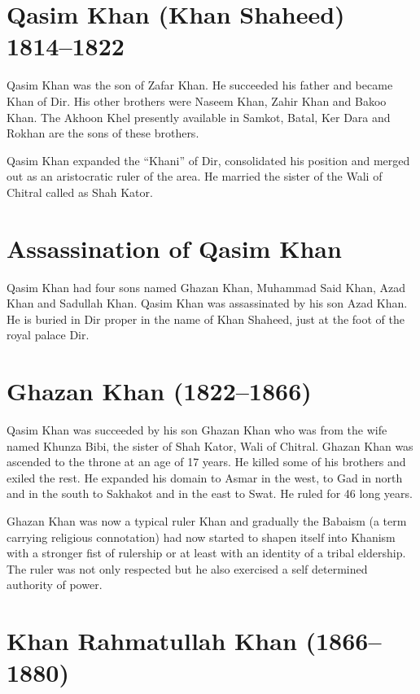 \documentclass[twoside,openright]{book}
\begin{document}
\section{Qasim Khan (Khan Shaheed) 1814--1822}

Qasim Khan was the son of Zafar Khan. He succeeded his father
and became Khan of Dir. His other brothers were Naseem Khan, Zahir
Khan and Bakoo Khan. The Akhoon Khel presently available in
Samkot, Batal, Ker Dara and Rokhan are the sons of these brothers.

Qasim Khan expanded the ``Khani'' of Dir, consolidated his
position and merged out as an aristocratic ruler of the area. He
married the sister of the Wali of Chitral called as Shah Kator.

\section{Assassination of Qasim Khan}

Qasim Khan had four sons named Ghazan Khan, Muhammad Said Khan, Azad Khan and
Sadullah Khan. Qasim Khan was assassinated by his son Azad Khan. He is buried in
Dir proper in the name of Khan Shaheed, just at the foot of the royal palace
Dir.

\section{Ghazan Khan (1822--1866)}

Qasim Khan was succeeded by his son Ghazan Khan who was from
the wife named Khunza Bibi, the sister of Shah Kator, Wali of
Chitral. Ghazan Khan was ascended to the throne at an age of 17
years. He killed some of his brothers and exiled the rest. He
expanded his domain to Asmar in the west, to Gad in north and in
the south to Sakhakot and in the east to Swat. He ruled for 46
long years.

Ghazan Khan was now a typical ruler Khan and gradually the Babaism (a term
carrying religious connotation) had now started to shapen itself into Khanism
with a stronger fist of rulership or at least with an identity of a tribal
eldership. The ruler was not only respected but he also exercised a self
determined authority of power.

\section{Khan Rahmatullah Khan (1866--1880)}
\end{document}
